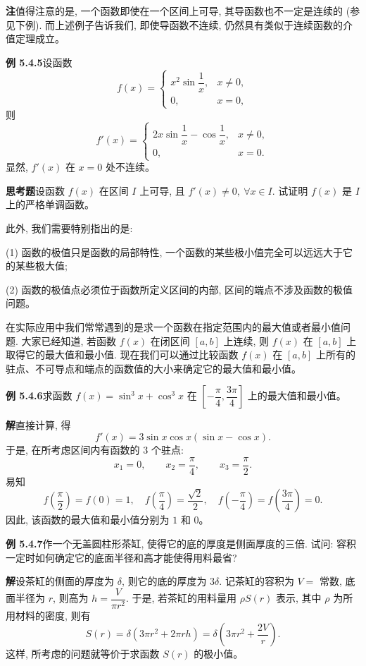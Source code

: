 \documentclass[UTF8, 12pt, fontset=fandol, oneside]{ctexart}
\begin{document}
\noindent\textbf{注}\quad 值得注意的是, 一个函数即使在一个区间上可导, 其导函数也不一定是连续的 (参见下例). 而上述例子告诉我们, 即使导函数不连续, 仍然具有类似于连续函数的介值定理成立。

\noindent\textbf{例 5.4.5}\quad 设函数
\[
  f(x)=
  \begin{cases}
    x^2\sin\dfrac1x, & x\ne0,\\
    0, & x=0,
  \end{cases}
\]
则
\[
  f'(x)=
  \begin{cases}
    2x\sin\dfrac1x-\cos\dfrac1x, & x\ne0,\\
    0, & x=0.
  \end{cases}
\]
显然, $f'(x)$ 在 $x=0$ 处不连续。

\noindent\textbf{思考题}\quad 设函数 $f(x)$ 在区间 $I$ 上可导, 且 $f'(x)\ne0,\ \forall x\in I$. 试证明 $f(x)$ 是 $I$ 上的严格单调函数。

此外, 我们需要特别指出的是:

(1) 函数的极值只是函数的局部特性, 一个函数的某些极小值完全可以远远大于它的某些极大值;

(2) 函数的极值点必须位于函数所定义区间的内部, 区间的端点不涉及函数的极值问题。

在实际应用中我们常常遇到的是求一个函数在指定范围内的最大值或者最小值问题. 大家已经知道, 若函数 $f(x)$ 在闭区间 $[a,b]$ 上连续, 则 $f(x)$ 在 $[a,b]$ 上取得它的最大值和最小值. 现在我们可以通过比较函数 $f(x)$ 在 $[a,b]$ 上所有的驻点、不可导点和端点的函数值的大小来确定它的最大值和最小值。

\noindent\textbf{例 5.4.6}\quad 求函数 $f(x)=\sin^3x+\cos^3x$ 在 $\left[-\dfrac\pi4,\dfrac{3\pi}4\right]$ 上的最大值和最小值。

\noindent\textbf{解}\quad 直接计算, 得
\[
  f'(x)=3\sin x\cos x(\sin x-\cos x).
\]
于是, 在所考虑区间内有函数的 $3$ 个驻点:
\[
  x_1=0,\qquad x_2=\frac\pi4,\qquad x_3=\frac\pi2.
\]
易知
\[
  f\left(\frac\pi2\right)=f(0)=1,\quad
  f\left(\frac\pi4\right)=\frac{\sqrt2}{2},\quad
  f\left(-\frac\pi4\right)=f\left(\frac{3\pi}4\right)=0.
\]
因此, 该函数的最大值和最小值分别为 $1$ 和 $0$。

\noindent\textbf{例 5.4.7}\quad 作一个无盖圆柱形茶缸, 使得它的底的厚度是侧面厚度的三倍. 试问: 容积一定时如何确定它的底面半径和高才能使得用料最省?

\noindent\textbf{解}\quad 设茶缸的侧面的厚度为 $\delta$, 则它的底的厚度为 $3\delta$. 记茶缸的容积为 $V=$ 常数, 底面半径为 $r$, 则高为 $h=\dfrac{V}{\pi r^2}$. 于是, 若茶缸的用料量用 $\rho S(r)$ 表示, 其中 $\rho$ 为所用材料的密度, 则有
\[
  S(r)=\delta(3\pi r^2+2\pi rh)
  =\delta\left(3\pi r^2+\frac{2V}{r}\right).
\]
这样, 所考虑的问题就等价于求函数 $S(r)$ 的极小值。
\end{document}
